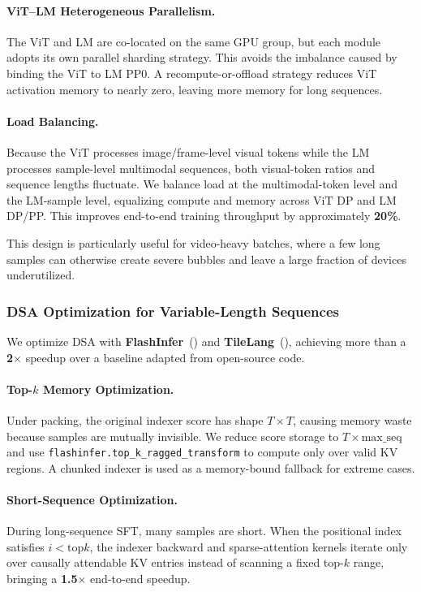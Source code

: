 \documentclass{article} %
\begin{document}
\paragraph{ViT--LM Heterogeneous Parallelism.}
The ViT and LM are co-located on the same GPU group, but each module adopts its own parallel sharding strategy. This avoids the imbalance caused by binding the ViT to LM PP0. A recompute-or-offload strategy reduces ViT activation memory to nearly zero, leaving more memory for long sequences.

\paragraph{Load Balancing.}
Because the ViT processes image/frame-level visual tokens while the LM processes sample-level multimodal sequences, both visual-token ratios and sequence lengths fluctuate. We balance load at the multimodal-token level and the LM-sample level, equalizing compute and memory across ViT DP and LM DP/PP. This improves end-to-end training throughput by approximately \textbf{20\%}.

This design is particularly useful for video-heavy batches, where a few long samples can otherwise create severe bubbles and leave a large fraction of devices underutilized.

\subsubsection{DSA Optimization for Variable-Length Sequences}

We optimize DSA with \textbf{FlashInfer}~(\cite{flashinfer}) and \textbf{TileLang}~(\cite{tilelang}), achieving more than a \textbf{2$\times$} speedup over a baseline adapted from open-source code.

\paragraph{Top-$k$ Memory Optimization.}
Under packing, the original indexer score has shape $T \times T$, causing memory waste because samples are mutually invisible. We reduce score storage to $T \times \text{max\_seq}$ and use \texttt{flashinfer.top\_k\_ragged\_transform} to compute only over valid KV regions. A chunked indexer is used as a memory-bound fallback for extreme cases.

\paragraph{Short-Sequence Optimization.}
During long-sequence SFT, many samples are short. When the positional index satisfies $i < \text{top}k$, the indexer backward and sparse-attention kernels iterate only over causally attendable KV entries instead of scanning a fixed top-$k$ range, bringing a \textbf{1.5$\times$} end-to-end speedup.
\end{document}

